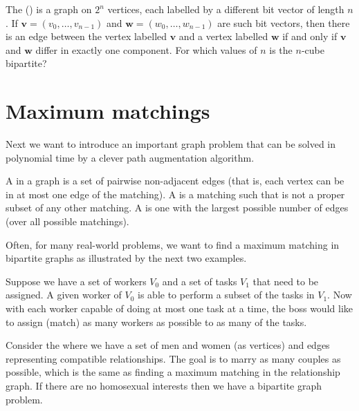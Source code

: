 \begin{Exercise}
\label{ex:do2col}
The  () is a 
graph on $2^n$ vertices, each labelled by
a different bit vector of length $n$. If $\mathbf{v} = (v_0, \dots ,
v_{n-1})$ and $\mathbf{w} = (w_0, \dots , w_{n-1})$ are such bit vectors,
then there is an edge between the vertex labelled $\mathbf{v}$ and a
vertex labelled $\mathbf{w}$ if and only if $\mathbf{v}$ and $\mathbf{w}$
differ in exactly one component. For which values of $n$ is the $n$-cube
bipartite?
\end{Exercise}

\section{Maximum matchings}
\label{sec:matching}

Next we want to introduce an important graph problem that can
be solved in polynomial time by a clever path augmentation algorithm.  

\begin{Definition}
A  in a graph is a set of pairwise non-adjacent edges
(that is, each vertex can be in at most one edge of the matching).
A  is a matching such that is not a proper subset
of any other matching.
A  is one with the largest possible number of
edges (over all possible matchings).
\end{Definition}

Often, for many real-world problems, we want to find a maximum matching 
in bipartite graphs as illustrated by the next two examples.  

\begin{Example}
Suppose we have a set of workers $V_0$ and a set of tasks $V_1$ that need to be
assigned.  A given worker of $V_0$ is able to perform a subset of the tasks in $V_1$.
Now with each worker capable of doing at most one task at a time, the boss 
would like to assign (match) as many workers as possible to as many of 
the tasks. 
\end{Example}

\begin{Example}\label{ex:mp}
Consider the  
where we have a set of men and women (as vertices) and edges 
representing compatible 
relationships.  The goal is to marry as many couples
as possible, which is the same as finding a maximum matching in the
relationship graph.  If there are no homosexual interests then we have a 
bipartite graph problem.
\end{Example}

